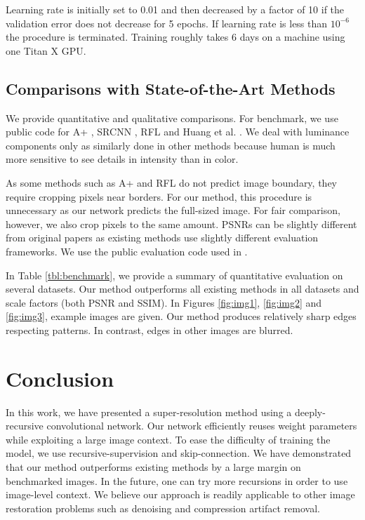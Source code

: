 \documentclass[10pt,twocolumn,letterpaper]{article}
\begin{document}
Learning rate is initially set to 0.01 and then decreased by a factor of 10 if the validation error does not decrease for 5 epochs. If learning rate is less than $10^{-6}$ the procedure is terminated. Training roughly takes 6 days on a machine using one Titan X GPU. 


\subsection{Comparisons with State-of-the-Art Methods}
We provide quantitative and qualitative comparisons. For benchmark, we use public code for A+ \cite{Timofte}, SRCNN \cite{dong2014image}, RFL \cite{schulter2015fast} and  Huang et al. \cite{Huang-CVPR-2015}. We deal with luminance components only as similarly done in other methods because human is much more sensitive to see details in intensity than in color. 

As  some methods such as A+ \cite{Timofte} and  RFL \cite{schulter2015fast} do not predict image boundary, they require cropping pixels near borders. For our method, this procedure is unnecessary as our network predicts the full-sized image. For fair comparison, however, we also crop pixels to the same amount. PSNRs can be slightly different from original papers as existing methods use slightly different evaluation frameworks. We use the public evaluation code used in \cite{Huang-CVPR-2015}.

In Table \ref{tbl:benchmark}, we provide a summary of quantitative evaluation on several datasets. 
Our method outperforms all existing methods in all datasets and scale factors (both PSNR and SSIM). In Figures \ref{fig:img1}, \ref{fig:img2} and \ref{fig:img3}, example images are given. Our method produces relatively sharp edges respecting patterns. In contrast, edges in other images are blurred.

\section{Conclusion}
In this work, we have presented a super-resolution method using a deeply-recursive convolutional network. Our network efficiently reuses weight parameters while exploiting a large image context. To ease the difficulty of training the model, we use recursive-supervision and skip-connection. We have demonstrated that our method outperforms existing methods by a large margin on benchmarked images. In the future, one can try more recursions in order to use image-level context. We believe our approach is readily applicable to other image restoration problems such as denoising and compression artifact removal.

{\small
	
	
}
\end{document}
